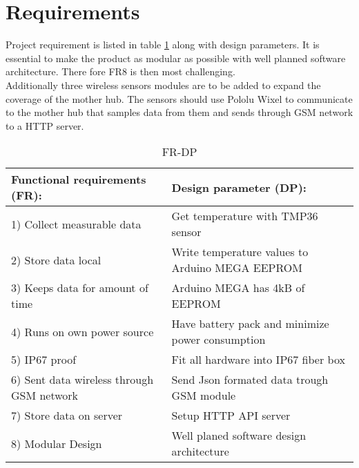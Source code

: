 \section{Requirements}\label{requirements}
Project requirement is listed in table \ref{tbl:FRDP} along with design parameters.
It is essential to make the product as modular as possible with well planned software architecture. There fore FR8 is then most challenging. \\
Additionally three wireless sensors modules are to be added to expand the coverage of the mother hub.  The sensors should use Pololu Wixel to communicate to the mother hub that samples data from them and sends through GSM network to a HTTP server.

\begin{table}[H]
	\caption{FR-DP}
	\label{tbl:FRDP}
\begin{tabular}{|p{8cm}|p{8cm}|}
		\hline \textbf{Functional requirements (FR):} & \textbf{Design parameter (DP):} \\ 
		\hline 1) Collect measurable data &   Get temperature with TMP36\cite{Devices2010} sensor\\
		\hline 2) Store data local &   Write temperature values to Arduino MEGA EEPROM \\
		\hline 3) Keeps data for amount of time &  Arduino MEGA \cite{arduinoMega} has 4kB of EEPROM \\
		\hline 4) Runs on own power source & Have battery pack and minimize power consumption \\ 
		\hline 5) IP67 proof &   Fit all hardware into IP67 fiber box\\
		\hline 6) Sent data wireless through GSM network & Send Json formated data trough GSM module \\ 
		\hline 7) Store data on server & Setup HTTP API server \\ 
		\hline 8) Modular Design & Well planed software design architecture \\ 
		\hline
	\end{tabular}
\end{table}
